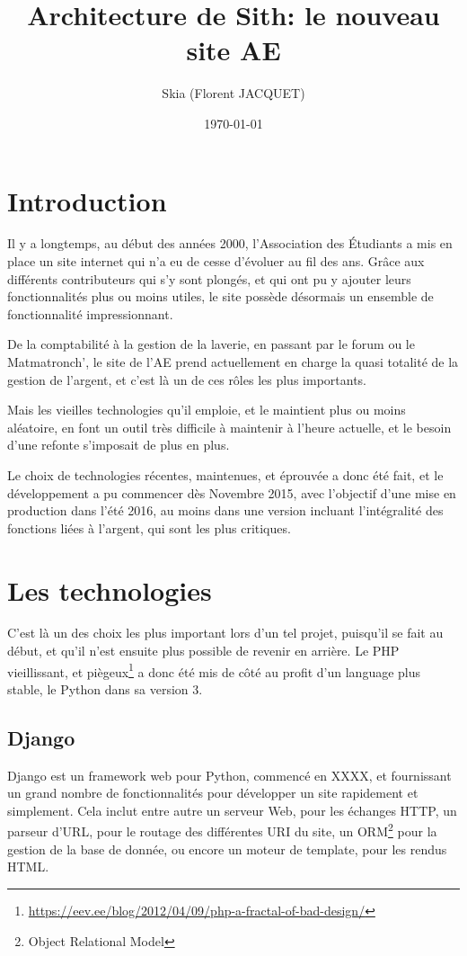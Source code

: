 \documentclass[a4paper]{report}
\title{Architecture de Sith: le nouveau site AE}
\author{Skia (Florent JACQUET)}
\date{\today}
\begin{document}
\tableofcontents
\listoffigures

\chapter*{Introduction}
\par
Il y a longtemps, au début des années 2000, l'Association des Étudiants a mis en place un site internet qui n'a eu de
cesse d'évoluer au fil des ans. Grâce aux différents contributeurs qui s'y sont plongés, et qui ont pu y ajouter leurs
fonctionnalités plus ou moins utiles, le site possède désormais un ensemble de fonctionnalité impressionnant.
\par
De la comptabilité à la gestion de la laverie, en passant par le forum ou le Matmatronch', le site de l'AE prend
actuellement en charge la quasi totalité de la gestion de l'argent, et c'est là un de ces rôles les plus importants.
\par
Mais les vieilles technologies qu'il emploie, et le maintient plus ou moins aléatoire, en font un outil très difficile à
maintenir à l'heure actuelle, et le besoin d'une refonte s'imposait de plus en plus.
\par
Le choix de technologies récentes, maintenues, et éprouvée a donc été fait, et le développement a pu commencer dès
Novembre 2015, avec l'objectif d'une mise en production dans l'été 2016, au moins dans une version incluant
l'intégralité des fonctions liées à l'argent, qui sont les plus critiques.

\chapter{Les technologies}
\label{cha:les_technologies}
\par
C'est là un des choix les plus important lors d'un tel projet, puisqu'il se fait au début, et qu'il n'est ensuite plus
possible de revenir en arrière. Le PHP vieillissant, et
piègeux\footnote{\url{https://eev.ee/blog/2012/04/09/php-a-fractal-of-bad-design/}} a donc été mis de côté au profit
d'un language plus stable, le Python dans sa version 3.

\section{Django}
\label{sec:django}
\par
Django est un framework web pour Python, commencé en XXXX, et fournissant un grand nombre de fonctionnalités pour
développer un site rapidement et simplement. Cela inclut entre autre un serveur Web, pour les échanges HTTP, un parseur
d'URL, pour le routage des différentes URI du site, un ORM\footnote{Object Relational Model} pour la gestion de la base
de donnée, ou encore un moteur de template, pour les rendus HTML.
\end{document}
